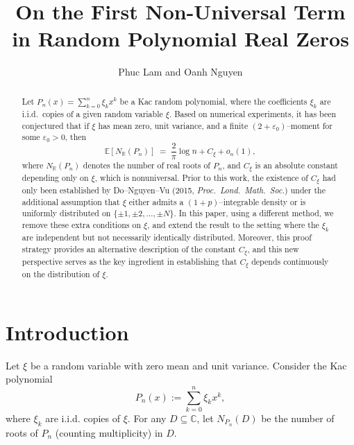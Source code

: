 \documentclass[12pt, reqno]{amsart}
\title{On the First Non-Universal Term in Random Polynomial Real Zeros}
\author{Phuc Lam and Oanh Nguyen}
\date{}
\theoremstyle{plain}
\theoremstyle{definition}
\newcommand\C{{\mathbb{C}}}
\begin{document}
 
\maketitle

\begin{abstract}
    Let $P_n(x) = \sum_{k=0}^{n} \xi_k x^k$ be a Kac random polynomial, where the coefficients $\xi_k$ are i.i.d.\ copies of a given random variable $\xi$. Based on numerical experiments, it has been conjectured that if $\xi$ has mean zero, unit variance, and a finite $(2+\varepsilon_0)$--moment for some $\varepsilon_0>0$, then
    \[
    \mathbb{E}[N_{\mathbb{R}}(P_n)] \;=\; \frac{2}{\pi} \log n + C_{\xi} + o_n(1),
    \]
    where $N_{\mathbb{R}}(P_n)$ denotes the number of real roots of $P_n$, and $C_{\xi}$ is an absolute constant depending only on $\xi$, which is nonuniversal. Prior to this work, the existence of $C_{\xi}$ had only been established by Do--Nguyen--Vu (2015, \emph{Proc.\ Lond.\ Math.\ Soc.}) under the additional assumption that $\xi$ either admits a $(1+p)$--integrable density or is uniformly distributed on $\{\pm 1, \pm 2, \dots, \pm N\}$. In this paper, using a different method, we remove these extra conditions on $\xi$, and extend the result to the setting where the $\xi_k$ are independent but not necessarily identically distributed. Moreover, this proof strategy provides an alternative description of the constant $C_{\xi}$, 
    and this new perspective serves as the key ingredient in establishing that $C_{\xi}$ 
    depends continuously on the distribution of $\xi$.
    \end{abstract}

 

\section{Introduction}
Let $\xi$ be a random variable with zero mean and unit variance. Consider the Kac polynomial
\begin{equation*}
    P_n(x) := \sum_{k = 0}^{n} \xi_k x^k,
\end{equation*}
where $\xi_k$ are i.i.d. copies of $\xi$. For any $D \subseteq \C$, let $N_{P_n}(D)$ be the number of roots of $P_n$ (counting multiplicity) in $D$. 
\end{document}
